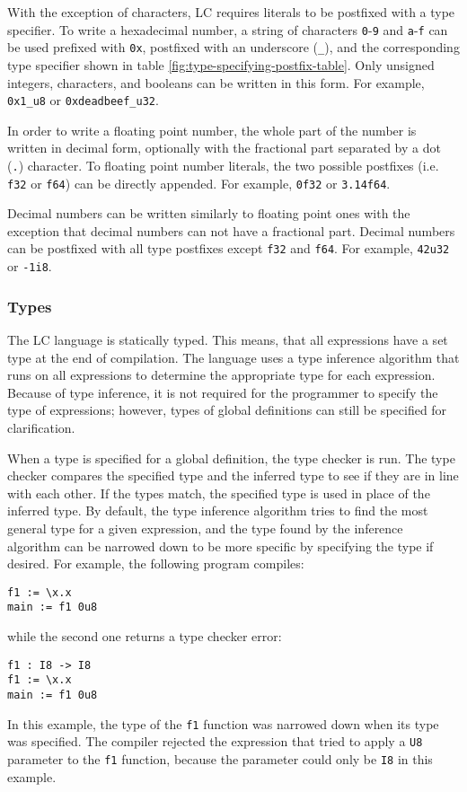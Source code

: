 \documentclass[12pt]{article}
\begin{document}
With the exception of characters, LC requires literals to be postfixed with a
type specifier. To write a hexadecimal number, a string of characters
\verb$0$-\verb$9$ and \verb$a$-\verb$f$ can be used prefixed with \verb$0x$,
postfixed with an underscore (\verb$_$), and the corresponding type specifier
shown in table \ref{fig:type-specifying-postfix-table}. Only unsigned integers,
characters, and booleans can be written in this form. For example, \verb$0x1_u8$
or \verb$0xdeadbeef_u32$.

In order to write a floating point number, the whole part of the number is
written in decimal form, optionally with the fractional part separated by a dot
(\verb$.$) character. To floating point number literals, the two possible
postfixes (i.e. \verb$f32$ or \verb$f64$) can be directly appended. For example,
\verb$0f32$ or \verb$3.14f64$.

Decimal numbers can be written similarly to floating point ones with the
exception that decimal numbers can not have a fractional part. Decimal numbers
can be postfixed with all type postfixes except \verb$f32$ and \verb$f64$. For
example, \verb$42u32$ or \verb$-1i8$.

\subsubsection{Types}

The LC language is statically typed. This means, that all expressions have a
set type at the end of compilation. The language uses a type inference algorithm
that runs on all expressions to determine the appropriate type for each
expression. Because of type inference, it is not required for the programmer to
specify the type of expressions; however, types of global definitions can still 
be specified for clarification.

When a type is specified for a global definition, the type checker is run. The
type checker compares the specified type and the inferred type to see if they
are in line with each other. If the types match, the specified type is used in
place of the inferred type. By default, the type inference algorithm tries to
find the most general type for a given expression, and the type found by the
inference algorithm can be narrowed down to be more specific by specifying the
type if desired. For example, the following program compiles:
\begin{lstlisting}
f1 := \x.x
main := f1 0u8
\end{lstlisting}
while the second one returns a type checker error:
\begin{lstlisting}
f1 : I8 -> I8
f1 := \x.x
main := f1 0u8
\end{lstlisting}
In this example, the type of the \verb$f1$ function was narrowed down when its
type was specified. The compiler rejected the expression that tried to apply a
\verb$U8$ parameter to the \verb$f1$ function, because the parameter could only
be \verb$I8$ in this example.
\end{document}
